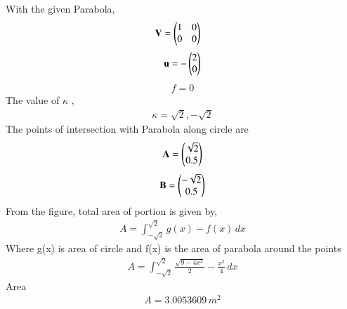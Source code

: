 With the given Parabola,\\ 
\begin{align}
	\mathbf{V} &= \begin{pmatrix}
1 & 0\\
0 & 0
    \end{pmatrix}
\end{align}
\begin{align}
	\mathbf{u} = -\begin{pmatrix}2 \\0\end{pmatrix}
 \end{align}
 \begin{align}
  f = 0
 \end{align}
The value of $\kappa$ ,\\
\begin{align}
    \kappa = \sqrt{2},-\sqrt{2}
\end{align}
The points of intersection with Parabola along circle are \\
\begin{align}
    \mathbf{A}=\begin{pmatrix}
\sqrt{2}\\
0.5
    \end{pmatrix}
\end{align}
\begin{align}
    \mathbf{B}=\begin{pmatrix}
-\sqrt{2}\\
0.5
    \end{pmatrix}
\end{align}
 From the figure,
total area of portion is given by, 
\begin{align}
 A=  \int_{-\sqrt{2}}^{\sqrt{2}} g(x)-f(x) \,dx 
\end{align}
Where g(x) is area of circle and f(x) is the area of parabola around the points\\ 
\begin{align}
A= \int_{-\sqrt{2}}^{\sqrt{2}} \frac{\sqrt{9-4x^2}}{2}-\frac{x^2}{4} \,dx 
\end{align}
Area  
\begin{align}
    A= 3.0053609 \,m^2
\end{align}
